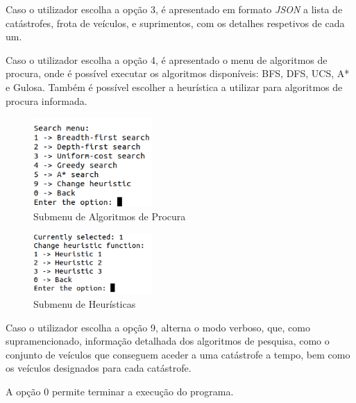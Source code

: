 \documentclass[a4paper,12pt]{scrreprt}
\begin{document}
Caso o utilizador escolha a opção 3, é apresentado em formato \textit{JSON} a lista de catástrofes, frota de veículos,
e suprimentos, com os detalhes respetivos de cada um.

\clearpage

Caso o utilizador escolha a opção 4, é apresentado o menu de algoritmos de procura, onde é possível executar
os algoritmos disponíveis: BFS, DFS, UCS, A* e Gulosa. Também é possível escolher a heurística a utilizar para algoritmos
de procura informada.

\begin{figure}[H]
    \centering
    \includegraphics[width=0.4\textwidth]{img/search_menu.png}
    \caption{Submenu de Algoritmos de Procura}
    \label{fig:search_menu}
\end{figure}

\begin{figure}[H]
    \centering
    \includegraphics[width=0.4\textwidth]{img/change_heuristic.png}
    \caption{Submenu de Heurísticas}
    \label{fig:change_heuristic}
\end{figure}

Caso o utilizador escolha a opção 9, alterna o modo verboso, que, como supramencionado,
informação detalhada dos algoritmos de pesquisa, como o conjunto de veículos que conseguem aceder
a uma catástrofe a tempo, bem como os veículos designados para cada catástrofe.

A opção 0 permite terminar a execução do programa.


\end{document}
